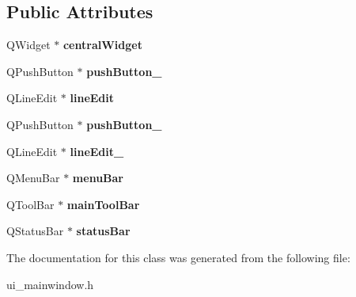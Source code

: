 \subsection*{Public Attributes}
\begin{DoxyCompactItemize}
\item 
Q\+Widget $\ast$ {\bfseries central\+Widget}\hypertarget{classUi__MainWindow_a30075506c2116c3ed4ff25e07ae75f81}{}\label{classUi__MainWindow_a30075506c2116c3ed4ff25e07ae75f81}

\item 
Q\+Push\+Button $\ast$ {\bfseries push\+Button\+\_}\hypertarget{classUi__MainWindow_a6fdadda10a8bec1d52af4b66f782e076}{}\label{classUi__MainWindow_a6fdadda10a8bec1d52af4b66f782e076}

\item 
Q\+Line\+Edit $\ast$ {\bfseries line\+Edit}\hypertarget{classUi__MainWindow_a7a5b9a4633d64f502ce81da3202d828c}{}\label{classUi__MainWindow_a7a5b9a4633d64f502ce81da3202d828c}

\item 
Q\+Push\+Button $\ast$ {\bfseries push\+Button\+\_}\hypertarget{classUi__MainWindow_a59a7d8124bce933d63f53f2153d447b4}{}\label{classUi__MainWindow_a59a7d8124bce933d63f53f2153d447b4}

\item 
Q\+Line\+Edit $\ast$ {\bfseries line\+Edit\+\_}\hypertarget{classUi__MainWindow_a21de642ed1cae607a93ed897a08bfe09}{}\label{classUi__MainWindow_a21de642ed1cae607a93ed897a08bfe09}

\item 
Q\+Menu\+Bar $\ast$ {\bfseries menu\+Bar}\hypertarget{classUi__MainWindow_a2be1c24ec9adfca18e1dcc951931457f}{}\label{classUi__MainWindow_a2be1c24ec9adfca18e1dcc951931457f}

\item 
Q\+Tool\+Bar $\ast$ {\bfseries main\+Tool\+Bar}\hypertarget{classUi__MainWindow_a5172877001c8c7b4e0f6de50421867d1}{}\label{classUi__MainWindow_a5172877001c8c7b4e0f6de50421867d1}

\item 
Q\+Status\+Bar $\ast$ {\bfseries status\+Bar}\hypertarget{classUi__MainWindow_a50fa481337604bcc8bf68de18ab16ecd}{}\label{classUi__MainWindow_a50fa481337604bcc8bf68de18ab16ecd}

\end{DoxyCompactItemize}


The documentation for this class was generated from the following file\+:\begin{DoxyCompactItemize}
\item 
ui\+\_\+mainwindow.\+h\end{DoxyCompactItemize}
